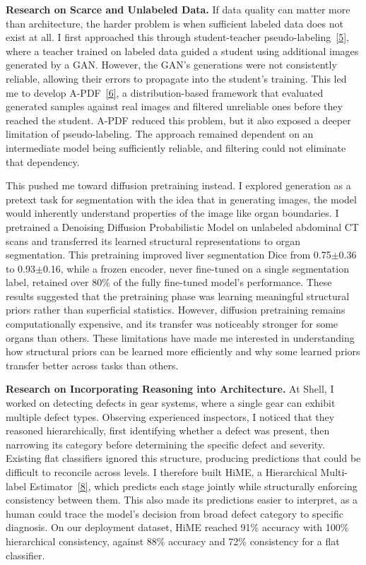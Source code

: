 \documentclass[12pt]{article}
\begin{document}
\textbf{Research on Scarce and Unlabeled Data.} If data quality can matter more than architecture, the harder problem is when sufficient labeled data does not exist at all. I first approached this through student-teacher pseudo-labeling~\hyperref[ref5]{[5]}, where a teacher trained on labeled data guided a student using additional images generated by a GAN. However, the GAN's generations were not consistently reliable, allowing their errors to propagate into the student's training. This led me to develop A-PDF~\hyperref[ref6]{[6]}, a distribution-based framework that evaluated generated samples against real images and filtered unreliable ones before they reached the student. A-PDF reduced this problem, but it also exposed a deeper limitation of pseudo-labeling. The approach remained dependent on an intermediate model being sufficiently reliable, and filtering could not eliminate that dependency.

This pushed me toward diffusion pretraining instead. I explored generation as a pretext task for segmentation with the idea that in generating images, the model would inherently understand properties of the image like organ boundaries. I pretrained a Denoising Diffusion Probabilistic Model on unlabeled abdominal CT scans and transferred its learned structural representations to organ segmentation. This pretraining improved liver segmentation Dice from 0.75$\pm$0.36 to 0.93$\pm$0.16, while a frozen encoder, never fine-tuned on a single segmentation label, retained over 80\% of the fully fine-tuned model's performance. These results suggested that the pretraining phase was learning meaningful structural priors rather than superficial statistics. However, diffusion pretraining remains computationally expensive, and its transfer was noticeably stronger for some organs than others. These limitations have made me interested in understanding how structural priors can be learned more efficiently and why some learned priors transfer better across tasks than others.



\vspace{8pt}

\textbf{Research on Incorporating Reasoning into Architecture.} At Shell, I worked on detecting defects in gear systems, where a single gear can exhibit multiple defect types. Observing experienced inspectors, I noticed that they reasoned hierarchically, first identifying whether a defect was present, then narrowing its category before determining the specific defect and severity. Existing flat classifiers ignored this structure, producing predictions that could be difficult to reconcile across levels. I therefore built HiME, a Hierarchical Multi-label Estimator~\hyperref[ref8]{[8]}, which predicts each stage jointly while structurally enforcing consistency between them. This also made its predictions easier to interpret, as a human could trace the model's decision from broad defect category to specific diagnosis. On our deployment dataset, HiME reached 91\% accuracy with 100\% hierarchical consistency, against 88\% accuracy and 72\% consistency for a flat classifier.
\end{document}
